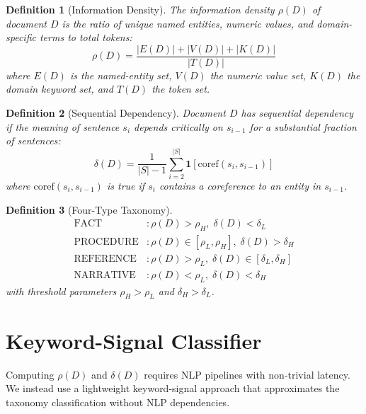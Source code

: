 \documentclass[conference]{IEEEtran}
\newtheorem{definition}{Definition}
\begin{document}
\begin{definition}[Information Density]
\label{def:density}
The information density $\rho(D)$ of document $D$ is
the ratio of unique named entities, numeric values, and
domain-specific terms to total tokens:
\begin{equation}
  \rho(D) = \frac{|E(D)| + |V(D)| + |K(D)|}{|T(D)|}
  \label{eq:density}
\end{equation}
where $E(D)$ is the named-entity set, $V(D)$ the numeric
value set, $K(D)$ the domain keyword set, and $T(D)$ the
token set.
\end{definition}

\begin{definition}[Sequential Dependency]
\label{def:dependency}
Document $D$ has sequential dependency if the meaning of
sentence $s_i$ depends critically on $s_{i-1}$ for a
substantial fraction of sentences:
\begin{equation}
  \delta(D) = \frac{1}{|S|-1}
    \sum_{i=2}^{|S|} \mathbf{1}[\text{coref}(s_i, s_{i-1})]
  \label{eq:dependency}
\end{equation}
where $\text{coref}(s_i, s_{i-1})$ is true if $s_i$
contains a coreference to an entity in $s_{i-1}$.
\end{definition}

\begin{definition}[Four-Type Taxonomy]
\label{def:taxonomy}
\begin{align}
  \text{FACT}      &: \rho(D) > \rho_H,\; \delta(D) < \delta_L
    \label{eq:fact} \\
  \text{PROCEDURE} &: \rho(D) \in [\rho_L, \rho_H],\;
    \delta(D) > \delta_H
    \label{eq:procedure} \\
  \text{REFERENCE} &: \rho(D) > \rho_L,\;
    \delta(D) \in [\delta_L, \delta_H]
    \label{eq:reference} \\
  \text{NARRATIVE} &: \rho(D) < \rho_L,\;
    \delta(D) < \delta_H
    \label{eq:narrative}
\end{align}
with threshold parameters $\rho_H > \rho_L$ and
$\delta_H > \delta_L$.
\end{definition}

\section{Keyword-Signal Classifier}
\label{sec:classifier}

Computing $\rho(D)$ and $\delta(D)$ requires NLP pipelines
with non-trivial latency. We instead use a lightweight
keyword-signal approach that approximates the taxonomy
classification without NLP dependencies.
\end{document}
